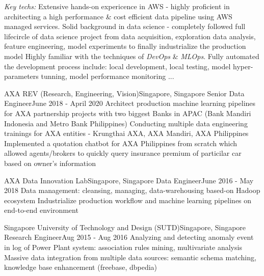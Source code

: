       \emph{Key techs:}
      \resumeItemListStart
          {Extensive hands-on expericence in AWS - highly proficient in architecting a high performance \& cost efficient data pipeline using AWS managed services.}
          {Solid background in data science - completely followed full lifecircle of data science project from data acquisition, exploration data analysis, feature engineering,
          model experiments to finally industrialize the production model}
          {Highly familiar with the techniques of \emph{DevOps} \& \emph{MLOps}. Fully automated the development process include: local development, local testing, model hyper-parameters tunning, model performance monitoring ...}
      \resumeItemListEnd

    \resumeSubheading
      {AXA REV (Research, Engineering, Vision)}{Singapore, Singapore}
      {Senior Data Engineer}{June 2018 - April 2020}
      \resumeItemListStart
          {Architect production machine learning pipelines for AXA partnership projects with two biggest Banks in APAC (Bank Mandiri Indonesia and Metro Bank Philippines)}
          {Conducting multiple data engineering trainings for AXA entities - Krungthai AXA, AXA Mandiri, AXA Philippines}
          {Implemented a quotation chatbot for AXA Philippines from scratch which allowed agents/brokers to quickly query insurance premium of particilar car based on owner's information}
      \resumeItemListEnd

    \resumeSubheading
      {AXA Data Innovation Lab}{Singapore, Singapore}
      {Data Engineer}{June 2016 - May 2018}
      \resumeItemListStart
          {Data management: cleansing, managing, data-warehousing based-on Hadoop ecosystem}
          {Industrialize production workflow and machine learning pipelines on end-to-end environment}
      \resumeItemListEnd
    
    \resumeSubheading
      {Singapore University of Technology and Design (SUTD)}{Singapore, Singapore}
      {Research Engineer}{Aug 2015 - Aug 2016}
      \resumeItemListStart
          {Analyzing and detecting anomaly event in log of Power Plant system: association rules mining, multivariate analysis}
          {Massive data integration from multiple data sources: semantic schema matching, knowledge base enhancement (freebase, dbpedia)}
      \resumeItemListEnd

